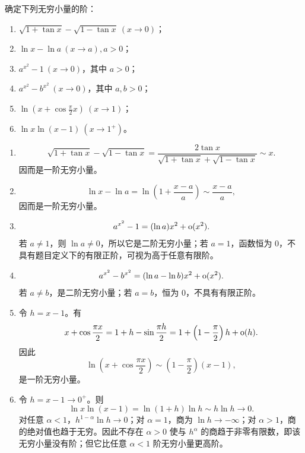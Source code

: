 \begin{xexercise}[1]
确定下列无穷小量的阶：
  \begin{enumerate}
    \item $\sqrt{1+\tan x}-\sqrt{1-\tan x}\ (x\to0)$；
    \item $\ln x-\ln a\ (x\to a),a>0$；
    \item $a^{x^2}-1\ (x\to0)$，其中 $a>0$；
    \item $a^{x^2}-b^{x^2}\ (x\to0)$，其中 $a,b>0$；
    \item $\ln\left(x+\cos\frac\pi2x\right)\ (x\to1)$；
    \item $\ln x\ln(x-1)\ (x\to1^+)$。
  \end{enumerate}
\end{xexercise}
\begin{xsolution}
\begin{enumerate}[label=(\arabic*)]
  \item
  \[
    \sqrt{1+\tan x}-\sqrt{1-\tan x}
    =\frac{2\tan x}{\sqrt{1+\tan x}+\sqrt{1-\tan x}}
    \sim x.
  \]
  因而是一阶无穷小量。

  \item
  \[
    \ln x-\ln a=\ln\left(1+\frac{x-a}{a}\right)
    \sim\frac{x-a}{a},
  \]
  因而是一阶无穷小量。

  \item
  \[
    a^{x^2}-1=(\ln a)x^2+\mathrm{o}(x^2).
  \]
  若 $a\ne1$，则 $\ln a\ne0$，所以它是二阶无穷小量；若 $a=1$，函数恒为 0，不具有题目定义下的有限正阶，可视为高于任意有限阶。

  \item
  \[
    a^{x^2}-b^{x^2}
    =(\ln a-\ln b)x^2+\mathrm{o}(x^2).
  \]
  若 $a\ne b$，是二阶无穷小量；若 $a=b$，恒为 0，不具有有限正阶。

  \item 令 $h=x-1$。有
  \[
    x+\cos\frac{\pi x}{2}
    =1+h-\sin\frac{\pi h}{2}
    =1+\left(1-\frac\pi2\right)h+\mathrm{o}(h).
  \]
  因此
  \[
    \ln\left(x+\cos\frac{\pi x}{2}\right)
    \sim\left(1-\frac\pi2\right)(x-1),
  \]
  是一阶无穷小量。

  \item 令 $h=x-1\to0^+$。则
  \[
    \ln x\ln(x-1)=\ln(1+h)\ln h\sim h\ln h\to0.
  \]
  对任意 $\alpha<1$，$h^{1-\alpha}\ln h\to0$；对 $\alpha=1$，商为 $\ln h\to-\infty$；对 $\alpha>1$，商的绝对值也趋于无穷。因此不存在 $\alpha>0$ 使与 $h^\alpha$ 的商趋于非零有限数，即该无穷小量没有阶；但它比任意 $\alpha<1$ 阶无穷小量更高阶。
\end{enumerate}
\end{xsolution}


